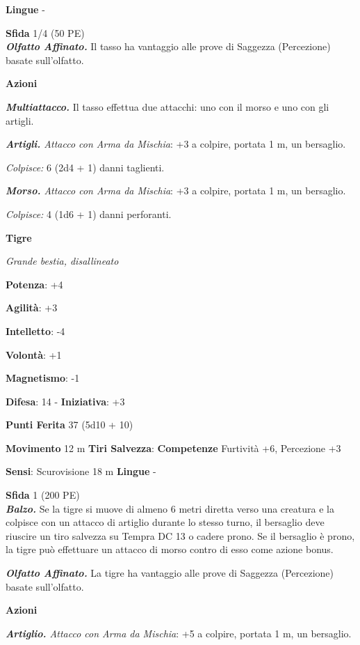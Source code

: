 \begin{multicols}{2}
\textbf{Lingue} -

\textbf{Sfida} 1/4 (50 PE)\smallskip\\

\emph{\textbf{Olfatto Affinato.}} Il tasso ha vantaggio alle prove di
Saggezza (Percezione) basate sull'olfatto.

\smallskip\textbf{Azioni}

\emph{\textbf{Multiattacco.}} Il tasso effettua due attacchi: uno con il
morso e uno con gli artigli.

\emph{\textbf{Artigli.} Attacco con Arma da Mischia}: +3 a colpire,
portata 1 m, un bersaglio.

\emph{Colpisce:} 6 (2d4 + 1) danni taglienti.

\emph{\textbf{Morso.} Attacco con Arma da Mischia}: +3 a colpire,
portata 1 m, un bersaglio.

\emph{Colpisce:} 4 (1d6 + 1) danni perforanti.

\textbf{Tigre}

\emph{Grande bestia, disallineato}

\textbf{Potenza}: +4

\textbf{Agilità}: +3

\textbf{Intelletto}: -4

\textbf{Volontà}: +1

\textbf{Magnetismo}: -1

\textbf{Difesa}: 14 - \textbf{Iniziativa}: +3

\textbf{Punti Ferita} 37 (5d10 + 10)

\textbf{Movimento} 12 m
\textbf{Tiri Salvezza}:
\textbf{Competenze} Furtività +6, Percezione +3

\textbf{Sensi}: Scurovisione 18 m
\textbf{Lingue} -

\textbf{Sfida} 1 (200 PE)\smallskip\\

\emph{\textbf{Balzo.}} Se la tigre si muove di almeno 6 metri diretta
verso una creatura e la colpisce con un attacco di artiglio durante lo
stesso turno, il bersaglio deve riuscire un tiro salvezza su Tempra DC 13
o cadere prono. Se il bersaglio è prono, la tigre può effettuare un
attacco di morso contro di esso come azione bonus.

\emph{\textbf{Olfatto Affinato.}} La tigre ha vantaggio alle prove di
Saggezza (Percezione) basate sull'olfatto.

\smallskip\textbf{Azioni}

\emph{\textbf{Artiglio.} Attacco con Arma da Mischia}: +5 a colpire,
portata 1 m, un bersaglio.


\end{multicols}
